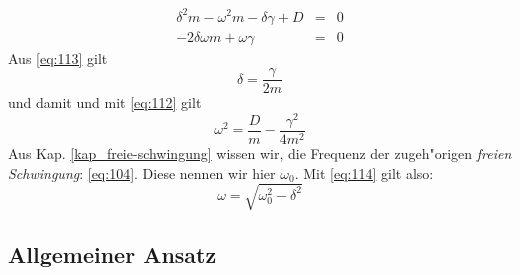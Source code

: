 \begin{eqnarray}
   \label{eq:112}
    \delta^2m - \omega^2m - \delta \gamma + D  &=& 0\\
\label{eq:113}
-2\delta\omega m +
 \omega \gamma &=& 0
\end{eqnarray}
Aus \eqref{eq:113} gilt 
\begin{equation}
   \label{eq:114}
   \delta = \frac{\gamma}{2m}
\end{equation}
und damit und mit \eqref{eq:112} gilt
\begin{equation}
   \label{eq:115}
\omega^2 =  \frac{D}{m} - \frac{\gamma^2}{4m^2}
\end{equation}
Aus Kap. \ref{kap_freie-schwingung}  wissen wir,
die Frequenz der zugeh"origen \emph{freien Schwingung}:
\eqref{eq:104}. Diese nennen wir hier $\omega_0$. Mit \eqref{eq:114}
gilt also:
\begin{equation}
   \label{eq:116}
\boxed{   \omega = \sqrt{\omega_0^2  -  \delta^2}  }
\end{equation}




\subsection{Allgemeiner Ansatz}
\label{kap_allgemeiner-ansatz}

